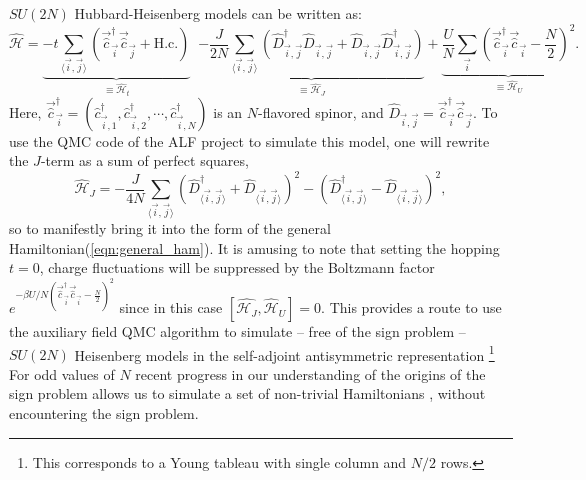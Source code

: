 $SU(2N)$ Hubbard-Heisenberg \cite{Assaad04,Lang13} models can be written as:
\begin{equation}
 \hat{\mathcal{H}}  =  
 \underbrace{ - t \sum_{ \langle \vec{i},\vec{j} \rangle }    \left(  \vec{\hat{c}}^{\dagger}_{\vec{i}}  \vec{\hat{c}}^{\phantom{\dagger}}_{\vec{j}} + \text{H.c.} \right) }_{\equiv \hat{\mathcal{H}}_t} \; \; 
\underbrace{ -\frac{J}{2 N}  \sum_{ \langle \vec{i},\vec{j} \rangle  } \left(
           \hat{D}^{\dagger}_{ \vec{i},\vec{j} }\hat{D}^{\phantom\dagger}_{ \vec{i},\vec{j}}  +
            \hat{D}^{\phantom\dagger}_{ \vec{i},\vec{j} } \hat{D}^{\dagger}_{ \vec{i},\vec{j} }  \right) }_{\equiv\hat{\mathcal{H}}_J}
            + 
 \underbrace{\frac{U}{N}  \sum_{\vec{i}} \left(
             \vec{\hat{c}}^{\dagger}_{\vec{i}}  \vec{\hat{c}}^{\phantom\dagger}_{\vec{i}} -  {\frac{N}{2} } \right)^2}_{\equiv \hat{\mathcal{H}}_U}.
\end{equation}
Here,
$ \vec{\hat{c}}^{\dagger}_{\vec{i}} =
(\hat{c}^{\dagger}_{\vec{i},1},  \hat{c}^{\dagger}_{\vec{i},2}, \cdots, \hat{c}^{\dagger}_{\vec{i}, N } ) $  is an
$N$-flavored spinor, and $ \hat{D}_{ \vec{i},\vec{j}} = \vec{\hat{c}}^{\dagger}_{\vec{i}}
\vec{\hat{c}}_{\vec{j}}  $.
To use the QMC code of the ALF project  to simulate this model, one will rewrite  the $J$-term as a sum of perfect squares, 
\begin{equation}
        \hat{\mathcal{H}}_J =  -\frac{J}{4 N}  \sum_{  \langle \vec{i}, \vec{j} \rangle }
        \left(\hat{D}^{\dagger}_{  \langle \vec{i}, \vec{j} \rangle  } +  \hat{D}_{  \langle \vec{i}, \vec{j} \rangle }  \right)^2  -
        \left(\hat{D}^{\dagger}_{   \langle \vec{i}, \vec{j} \rangle } -  \hat{D}_{  \langle \vec{i}, \vec{j} \rangle}  \right)^2,
\end{equation}
so to manifestly bring it into the form of the general Hamiltonian(\ref{eqn:general_ham}). 
It is amusing to note that setting the hopping $t=0$,    charge fluctuations  will be suppressed by the  Boltzmann factor $e^{-\beta U /N \left(  \vec{\hat{c}}^{\dagger}_{\vec{i}}  \vec{\hat{c}}^{\phantom\dagger}_{\vec{i}} -  {\frac{N}{2} } \right)^2 } $ 
since in this case  $ \left[   \hat{\mathcal{H}_J}, \hat{\mathcal{H}}_U \right]  = 0 $.
This provides a route to use the auxiliary field QMC algorithm  to simulate -- free of the sign problem -- $SU(2N)$ Heisenberg models in the self-adjoint antisymmetric representation  \footnote{ This corresponds to a Young tableau with single column and $N/2$ rows.}  
For odd values of $N$ recent progress  in our understanding of the  origins of the sign problem \cite{Wei16}  allows us to simulate  a set of non-trivial Hamiltonians \cite{Li15,Assaad16},  without encountering the sign problem.

